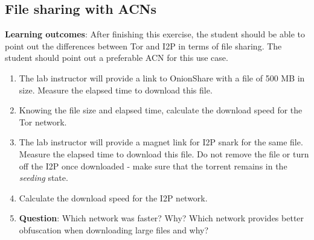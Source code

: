 \subsection{File sharing with ACNs}
\textbf{Learning outcomes}: After finishing this exercise, the student should be able to point out the differences between Tor and I2P in terms of file sharing. The student should point out a preferable ACN for this use case.
\begin{enumerate}
    \item The lab instructor will provide a link to OnionShare with a file of 500 MB in size. Measure the elapsed time to download this file.
    \item Knowing the file size and elapsed time, calculate the download speed for the Tor network.
    \item The lab instructor will provide a magnet link for I2P snark for the same file. Measure the elapsed time to download this file. Do not remove the file or turn off the I2P once downloaded - make sure that the torrent remains in the \textit{ seeding} state.
    \item Calculate the download speed for the I2P network.
    \item \textbf{Question}: Which network was faster? Why? Which network provides better obfuscation when downloading large files and why?
\end{enumerate}